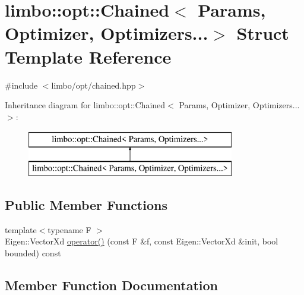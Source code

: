 \hypertarget{structlimbo_1_1opt_1_1_chained_3_01_params_00_01_optimizer_00_01_optimizers_8_8_8_4}{}\section{limbo\+:\+:opt\+:\+:Chained$<$ Params, Optimizer, Optimizers...$>$ Struct Template Reference}
\label{structlimbo_1_1opt_1_1_chained_3_01_params_00_01_optimizer_00_01_optimizers_8_8_8_4}


{\ttfamily \#include $<$limbo/opt/chained.\+hpp$>$}

Inheritance diagram for limbo\+:\+:opt\+:\+:Chained$<$ Params, Optimizer, Optimizers...$>$\+:\begin{figure}[H]
\begin{center}
\leavevmode
\includegraphics[height=2.000000cm]{structlimbo_1_1opt_1_1_chained_3_01_params_00_01_optimizer_00_01_optimizers_8_8_8_4}
\end{center}
\end{figure}
\subsection*{Public Member Functions}
\begin{DoxyCompactItemize}
\item 
{\footnotesize template$<$typename F $>$ }\\Eigen\+::\+Vector\+Xd \hyperlink{structlimbo_1_1opt_1_1_chained_3_01_params_00_01_optimizer_00_01_optimizers_8_8_8_4_a02bcc74dcdc42d685baaf277886fc8e5}{operator()} (const F \&f, const Eigen\+::\+Vector\+Xd \&init, bool bounded) const 
\end{DoxyCompactItemize}


\subsection{Member Function Documentation}
\hypertarget{structlimbo_1_1opt_1_1_chained_3_01_params_00_01_optimizer_00_01_optimizers_8_8_8_4_a02bcc74dcdc42d685baaf277886fc8e5}{}
